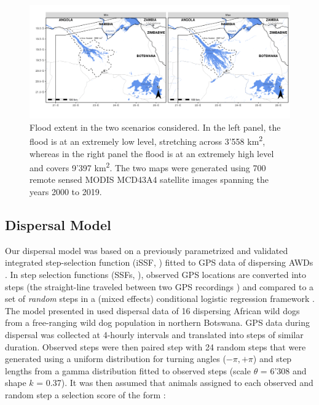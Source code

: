 \documentclass[abstract=on,10pt,a4paper,bibliography=totocnumbered]{article}
\begin{document}
\begin{figure}
  \begin{center}
  \includegraphics[width = \textwidth]{99_FloodExtent.png}
  \caption{Flood extent in the two scenarios considered. In the left panel, the
  flood is at an extremely low level, stretching across 3'558
  km\textsuperscript{2}, whereas in the right panel the flood is at an extremely
  high level and covers 9'397 km\textsuperscript{2}. The two maps were generated
  using 700 remote sensed MODIS MCD43A4 satellite images spanning the years 2000
  to 2019.}
  \label{FloodExtent}
  \end{center}
\end{figure}

\subsection{Dispersal Model}
Our dispersal model was based on a previously parametrized and validated
integrated step-selection function (iSSF, \citealp{Avgar.2016}) fitted to GPS
data of dispersing AWDs \citep{Hofmann.2021}. In step selection functions (SSFs,
\citealp{Fortin.2005}), observed GPS locations are converted into steps (the
straight-line traveled between two GPS recordings \citep{Turchin.1998a}) and
compared to a set of \textit{random} steps in a (mixed effects) conditional
logistic regression framework \citep{Fortin.2005, Thurfjell.2014, Muff.2020,
Fieberg.2021}. The model presented in \citep{Hofmann.2021} used dispersal data
of 16 dispersing African wild dogs from a free-ranging wild dog population in
northern Botswana. GPS data during dispersal was collected at 4-hourly intervals
and translated into steps of similar duration. Observed steps were then paired
step with 24 random steps that were generated using a uniform distribution for
turning angles (\(-\pi, +\pi\)) and step lengths from a gamma distribution
fitted to observed steps (scale \(\theta\) = 6'308 and shape \(k\) = 0.37). It
was then assumed that animals assigned to each observed and random step a
selection score of the form \citep{Fortin.2005}:
\end{document}
